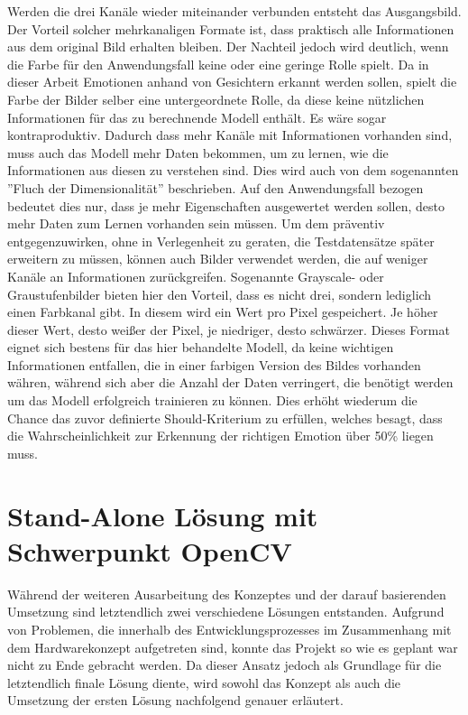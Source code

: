 \documentclass[12pt, a4paper]{report}
\begin{document}
Werden die drei Kanäle wieder miteinander verbunden entsteht das Ausgangsbild. Der Vorteil solcher mehrkanaligen Formate ist, dass praktisch alle Informationen aus dem original Bild erhalten bleiben. Der Nachteil jedoch wird deutlich, wenn die Farbe für den Anwendungsfall keine oder eine geringe Rolle spielt. Da in dieser Arbeit Emotionen anhand von Gesichtern erkannt werden sollen, spielt die Farbe der Bilder selber eine untergeordnete Rolle, da diese keine nützlichen Informationen für das zu berechnende Modell enthält. Es wäre sogar kontraproduktiv. Dadurch dass mehr Kanäle mit Informationen vorhanden sind, muss auch das Modell mehr Daten bekommen, um zu lernen, wie die Informationen aus diesen zu verstehen sind. Dies wird auch von dem sogenannten ''Fluch der Dimensionalität'' beschrieben. Auf den Anwendungsfall bezogen bedeutet dies nur, dass je mehr Eigenschaften ausgewertet werden sollen, desto mehr Daten zum Lernen vorhanden sein müssen. Um dem präventiv entgegenzuwirken, ohne in Verlegenheit zu geraten, die Testdatensätze später erweitern zu müssen, können auch Bilder verwendet werden, die auf weniger Kanäle an Informationen zurückgreifen. Sogenannte Grayscale- oder Graustufenbilder bieten hier den Vorteil, dass es nicht drei, sondern lediglich einen Farbkanal gibt. In diesem wird ein Wert pro Pixel gespeichert. Je höher dieser Wert, desto weißer der Pixel, je niedriger, desto schwärzer. Dieses Format eignet sich bestens für das hier behandelte Modell, da keine wichtigen Informationen entfallen, die in einer farbigen Version des Bildes vorhanden währen, während sich aber die Anzahl der Daten verringert, die benötigt werden um das Modell erfolgreich trainieren zu können. Dies erhöht wiederum die Chance das zuvor definierte Should-Kriterium zu erfüllen, welches besagt, dass die Wahrscheinlichkeit zur Erkennung der richtigen Emotion über 50\% liegen muss. 

\let\cleardoublepage\relax

\chapter{Stand-Alone Lösung mit Schwerpunkt OpenCV}
Während der weiteren Ausarbeitung des Konzeptes und der darauf basierenden Umsetzung sind letztendlich zwei verschiedene Lösungen entstanden. Aufgrund von Problemen, die innerhalb des Entwicklungsprozesses im Zusammenhang mit dem Hardwarekonzept aufgetreten sind, konnte das Projekt so wie es geplant war nicht zu Ende gebracht werden. Da dieser Ansatz jedoch als Grundlage für die letztendlich finale Lösung diente, wird sowohl das Konzept als auch die Umsetzung der ersten Lösung nachfolgend genauer erläutert.
\end{document}
